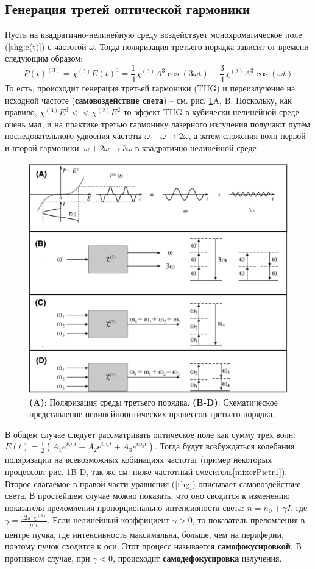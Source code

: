 \subsection*{Генерация третей оптической гармоники} 
Пусть на квадратично-нелинейную среду воздействует монохроматическое поле (\ref{shg:e(t)}) с частотой $\omega$. Тогда поляризация третьего порядка зависит от времени следующим образом:
\begin{equation}\label{thg}
P(t)^{(3)} = \chi^{(3)}E(t)^3 = \frac{1}{4}\chi^{(3)}A^3\cos(3\omega t) + \frac{3}{4}\chi^{(3)}A^3\cos(\omega t)
\end{equation}
То есть, происходит генерация третьей гармоники (THG) и переизлучение на исходной частоте (\textbf{самовоздействие света}) – см. рис. \ref{thg1}A, B. Поскольку, как правило, $\chi^{(3)}E^3 << \chi^{(2)}E^2$ то эффект THG в кубически-нелинейной среде очень мал, и на практике третью гармонику лазерного излучения получают путѐм последовательного удвоения частоты $\omega +  \omega \rightarrow 2\omega$, а затем сложения волн первой и второй гармоники: $\omega +  2\omega \rightarrow 3\omega$ в квадратично-нелинейной среде
\begin{figure}[h]
	\centering
	\includegraphics[width=0.8\linewidth]{images/thg.png}
	\caption{\textbf{(A)}: Поляризация среды третьего порядка. \textbf{(B-D)}: Схематическое представление нелинейнооптических процессов третьего порядка.}
	\label{thg1}
\end{figure}
В общем случае следует рассматривать оптическое поле как сумму трех волн: $E(t) = \frac{1}{2}(A_1e^{i\omega_1 t} + A_2e^{i\omega_2 t} + A_3e^{i\omega_3 t})$. Тогда будут возбуждаться колебания поляризации на всевозможных кобинациях частотат (пример некоторых процессовт рис. \ref{thg1}B-D, так-же см. ниже частотный смеситель\ref{mixerPictr1}). Второе слагаемое в правой части уравнения (\ref{thg}) описывает самовоздействие света. В простейшем случае можно показать, что оно сводится к изменению показателя преломления пропорционально интенсивности света: $n = n_0 + \gamma I$, где $ \gamma = \frac{12\pi^2 \chi^{(3)}}{n_{0}^{2}c} $. Если нелинейный коэффициент $\gamma > 0$, то показатель преломления в центре пучка, где интенсивность максимальна, больше, чем на периферии, поэтому пучок сходится к оси. Этот процесс называется \textbf{самофокусировкой}. В противном случае, при $\gamma < 0$, происходит \textbf{самодефокусировка} излучения. 


